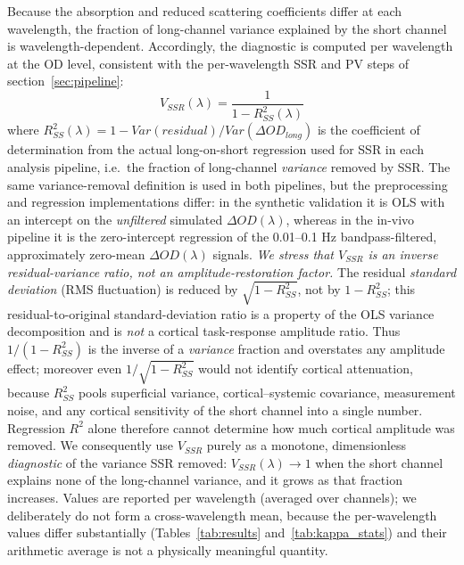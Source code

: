 \documentclass[11pt]{article}
\def\mathrm#1{#1}%
\def\,{ }%
\begin{document}
Because the absorption and reduced scattering coefficients differ at each wavelength, the fraction of long-channel variance explained by the short channel is wavelength-dependent. Accordingly, the diagnostic is computed per wavelength at the OD level, consistent with the per-wavelength SSR and PV steps of section~\ref{sec:pipeline}:
\begin{equation}
V_{\mathrm{SSR}}(\lambda) = \frac{1}{1 - R^2_{\mathrm{SS}}(\lambda)}
\label{eq:kappa_ssr}
\end{equation}
where $R^2_{\mathrm{SS}}(\lambda) = 1 - \mathrm{Var}(\mathrm{residual}) / \mathrm{Var}(\Delta\mathrm{OD}_{\mathrm{long}})$ is the coefficient of determination from the actual long-on-short regression used for SSR in each analysis pipeline, i.e.\ the fraction of long-channel \emph{variance} removed by SSR. The same variance-removal definition is used in both pipelines, but the preprocessing and regression implementations differ: in the synthetic validation it is OLS with an intercept on the \emph{unfiltered} simulated $\Delta\mathrm{OD}(\lambda)$, whereas in the in-vivo pipeline it is the zero-intercept regression of the 0.01--0.1\,Hz bandpass-filtered, approximately zero-mean $\Delta\mathrm{OD}(\lambda)$ signals. \emph{We stress that $V_{\mathrm{SSR}}$ is an inverse residual-variance ratio, not an amplitude-restoration factor.} The residual \emph{standard deviation} (RMS fluctuation) is reduced by $\sqrt{1-R^2_{\mathrm{SS}}}$, not by $1-R^2_{\mathrm{SS}}$; this residual-to-original standard-deviation ratio is a property of the OLS variance decomposition and is \emph{not} a cortical task-response amplitude ratio. Thus $1/(1-R^2_{\mathrm{SS}})$ is the inverse of a \emph{variance} fraction and overstates any amplitude effect; moreover even $1/\sqrt{1-R^2_{\mathrm{SS}}}$ would not identify cortical attenuation, because $R^2_{\mathrm{SS}}$ pools superficial variance, cortical--systemic covariance, measurement noise, and any cortical sensitivity of the short channel into a single number. Regression $R^2$ alone therefore cannot determine how much cortical amplitude was removed. We consequently use $V_{\mathrm{SSR}}$ purely as a monotone, dimensionless \emph{diagnostic} of the variance SSR removed: $V_{\mathrm{SSR}}(\lambda)\to1$ when the short channel explains none of the long-channel variance, and it grows as that fraction increases. Values are reported per wavelength (averaged over channels); we deliberately do not form a cross-wavelength mean, because the per-wavelength values differ substantially (Tables~\ref{tab:results} and~\ref{tab:kappa_stats}) and their arithmetic average is not a physically meaningful quantity.
\end{document}
